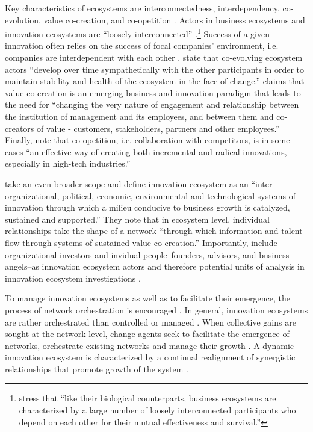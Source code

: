 Key characteristics of ecosystems are 
interconnectedness, 
interdependency,  
co-evolution, 
value co-creation, and 
co-opetition \citep{Jarvi2016TakingReview,Huhtamaki2011AFinancing}.
Actors in business ecosystems and innovation ecosystems are ``loosely interconnected'' \cite{Iansiti2004TheSustainability}.\footnote{\cite{Iansiti2004TheSustainability} stress that ``like their biological counterparts, business ecosystems are characterized by a large number of loosely interconnected participants who depend on each other for their mutual effectiveness and survival.''} Success of a given innovation often relies on the success of focal companies' environment, i.e. companies are interdependent with each other \citep{Adner2010ValueGenerations}. \cite{Thomas2012ModelingLiteratures} state that co-evolving ecosystem actors ``develop over time sympathetically with the other participants in order to maintain stability and health of the ecosystem in the face of change.''
\cite{Ramaswamy2009LeadingValue} claims that value co-creation is an emerging business and innovation paradigm that leads to the need for ``changing the very nature of engagement and relationship between the institution of management and its employees, and between them and co-creators of value - customers, stakeholders, partners and other employees.'' Finally,
\cite{Ritala2009WhatsCoopetition} note that co-opetition, i.e. collaboration with competitors, is in some cases ``an effective way of creating both incremental and radical innovations, especially in high-tech industries.'' 

\cite{Russell2011TransformingOrchestration} take an even broader scope and define innovation ecosystem as an ``inter-organizational, political, economic, environmental and technological systems of innovation through which a milieu conducive to business growth is catalyzed, sustained and supported.'' They note that in ecosystem level, individual relationships take the shape of a network ``through which information and talent flow through systems of sustained value co-creation.'' Importantly, \cite{Russell2011TransformingOrchestration} include organizational investors and invidual people--founders, advisors, and business angels--as innovation ecosystem actors and therefore potential units of analysis in innovation ecosystem investigations \cite[cf.][]{Huhtamaki2011AFinancing}.

To manage innovation ecosystems as well as to facilitate their emergence, the process of network orchestration is encouraged \citep{Russell2015RelationalEcosystems}. In general, innovation ecosystems are rather orchestrated than controlled or managed \citep{Russell2011TransformingOrchestration,Ritala2009,Ritala2013,Paquin2013}. When collective gains are sought at the network level, change agents seek to facilitate the emergence of networks, orchestrate existing networks and manage their growth \citep{Russell2011TransformingOrchestration}. A dynamic innovation ecosystem is characterized by a continual realignment of synergistic relationships that promote growth of the system \citep{Russell2015RelationalEcosystems}.

